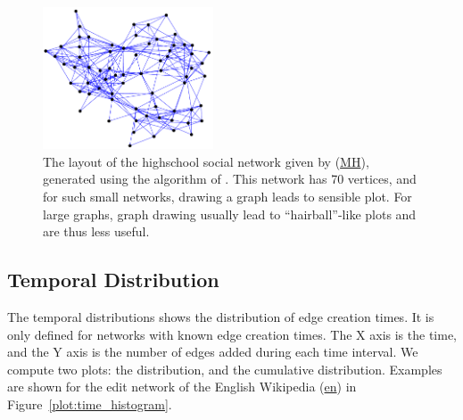 \documentclass{article}
\newcommand{\wPlot}{0.45\textwidth}
\begin{document}
\begin{figure}
  \centering
  \includegraphics[width=\wPlot]{plot/layout.a.moreno_highschool}
  \caption{
    \label{fig:fruchterman-reingold}
    The layout of the highschool social network given by \cite{konect:coleman}
    (\href{http://konect.cc/networks/moreno_highschool/}{\textsf{MH}}),
    generated using the algorithm of \cite{b870}.  This network has 70 vertices,
    and for such small networks, drawing a graph leads to sensible
    plot.  For large graphs, graph drawing usually lead to
    ``hairball''-like plots and are thus less useful.
  }
\end{figure}

\subsection{Temporal Distribution}
The temporal distributions shows the distribution of edge creation
times.  It is only defined for networks with known edge creation times.
The X axis is the time, and the Y axis is the number of edges added
during each time interval.  We compute two plots:  the distribution, and
the cumulative distribution.  Examples are shown for the edit network of
the English Wikipedia (\href{http://konect.cc/networks/edit-enwiki/}{\textsf{en}}) in Figure~\ref{plot:time_histogram}. 
\end{document}
